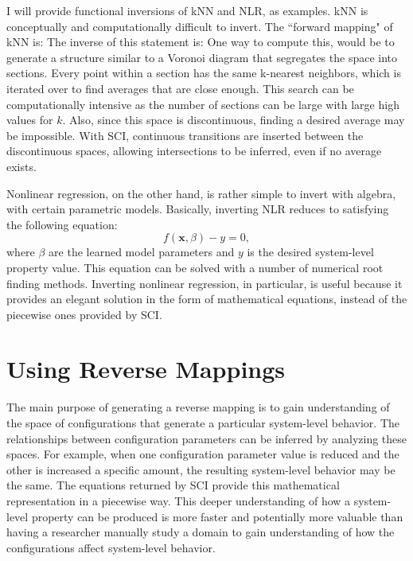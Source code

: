 I will provide functional inversions of kNN and NLR, as examples.
kNN is conceptually and computationally difficult to invert.
The ``forward mapping" of kNN is:
The inverse of this statement is:
One way to compute this, would be to generate a structure similar to a Voronoi diagram that segregates the space into sections.
Every point within a section has the same k-nearest neighbors, which is iterated over to find averages that are close enough.
This search can be computationally intensive as the number of sections can be large with large high values for $k$.
Also, since this space is discontinuous, finding a desired average may be impossible.
With SCI, continuous transitions are inserted between the discontinuous spaces, allowing intersections to be inferred, even if no average exists.

Nonlinear regression, on the other hand, is rather simple to invert with algebra, with certain parametric models.
Basically, inverting NLR reduces to satisfying the following equation:
\[f(\mathbf x, \beta) - y = 0,\]
where $\beta$ are the learned model parameters and $y$ is the desired system-level property value.
This equation can be solved with a number of numerical root finding methods.
Inverting nonlinear regression, in particular, is useful because it provides an elegant solution in the form of mathematical equations, instead of the piecewise ones provided by SCI.


\section{Using Reverse Mappings}
The main purpose of generating a reverse mapping is to gain understanding of the space of configurations that generate a particular system-level behavior.
The relationships between configuration parameters can be inferred by analyzing these spaces.
For example, when one configuration parameter value is reduced and the other is increased a specific amount, the resulting system-level behavior may be the same.
The equations returned by SCI provide this mathematical representation in a piecewise way.
This deeper understanding of how a system-level property can be produced is more faster and potentially more valuable than having a researcher manually study a domain to gain understanding of how the configurations affect system-level behavior.

